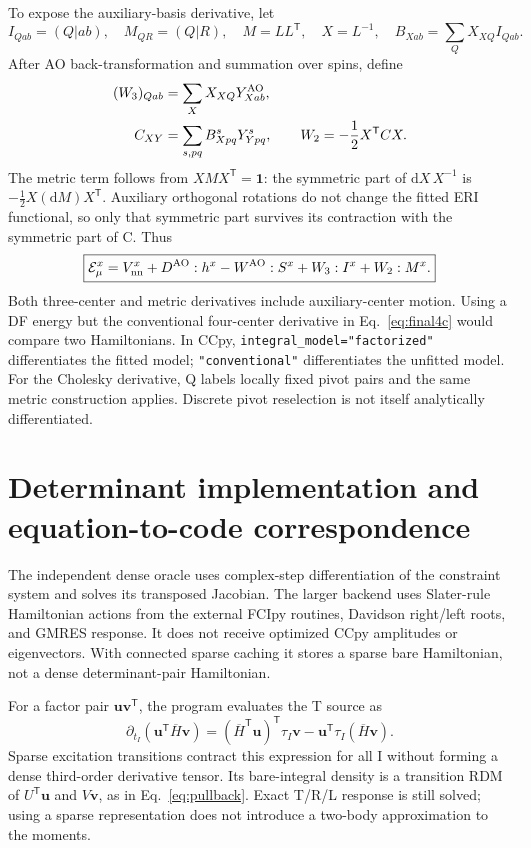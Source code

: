 \documentclass[11pt,letterpaper]{article}
\numberwithin{equation}{section}
\newcommand{\bH}{\overline H}
\newcommand{\T}{\mathsf T}
\newcommand{\dd}{\mathrm d}
\begin{document}
To expose the auxiliary-basis derivative, let
\begin{equation}
 I_{Qab}=(Q|ab),\quad M_{QR}=(Q|R),\quad M=LL^{\T},\quad
 X=L^{-1},\quad B_{Xab}=\sum_Q X_{XQ}I_{Qab}.
\end{equation}
After AO back-transformation and summation over spins, define
\begin{align}
 (W_3)_{Qab}&=\sum_X X_{XQ}Y^{\rm AO}_{Xab},\\
 C_{XY}&=\sum_{s,pq}B^s_{Xpq}Y^s_{Ypq},\qquad
 W_2=-\frac12X^{\T}CX.
 \label{eq:dfweights}
\end{align}
The metric term follows from $XMX^{\T}=\mathbf1$: the symmetric part of
$\dd X\,X^{-1}$ is $-\tfrac12X(\dd M)X^{\T}$. Auxiliary orthogonal
rotations do not change the fitted ERI functional, so only that symmetric
part survives its contraction with the symmetric part of C. Thus
\begin{equation}
 \boxed{\mathcal E_\mu^x=V_{\rm nn}^x+D^{\rm AO}:h^x-W^{\rm AO}:S^x
                            +W_3:I^x+W_2:M^x.}
 \label{eq:finaldf}
\end{equation}
Both three-center and metric derivatives include auxiliary-center motion.
Using a DF energy but the conventional four-center derivative in
Eq.~\eqref{eq:final4c} would compare two Hamiltonians. In CCpy,
\texttt{integral\_model="factorized"} differentiates the fitted model;
\texttt{"conventional"} differentiates the unfitted model.
For the Cholesky derivative, Q labels locally fixed pivot pairs and the same
metric construction applies. Discrete pivot reselection is not itself
analytically differentiated.

\section{Determinant implementation and equation-to-code correspondence}
\label{sec:implementation}
The independent dense oracle uses complex-step differentiation of the
constraint system and solves its transposed Jacobian. The larger backend
uses Slater-rule Hamiltonian actions from the external FCIpy routines,
Davidson right/left roots, and GMRES response. It does not receive optimized
CCpy amplitudes or eigenvectors. With connected sparse caching it stores a
sparse bare Hamiltonian, not a dense determinant-pair Hamiltonian.

For a factor pair $\bm u\bm v^{\T}$, the program evaluates the T source as
\begin{equation}
 \partial_{t_I}(\bm u^{\T}\bH\bm v)
   =(\bH^{\T}\bm u)^{\T}\tau_I\bm v
                         -\bm u^{\T}\tau_I(\bH\bm v).
 \label{eq:factorgradient}
\end{equation}
Sparse excitation transitions contract this expression for all I without
forming a dense third-order derivative tensor. Its bare-integral density
is a transition RDM of $U^{\T}\bm u$ and $V\bm v$, as in
Eq.~\eqref{eq:pullback}. Exact T/R/L response is still solved; using a sparse
representation does not introduce a two-body approximation to the moments.
\end{document}
